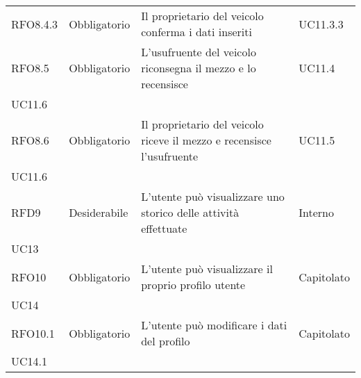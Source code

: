 \begin{longtable}{ >{\centering}p{} >{\centering}p{}
		>{\raggedright}p{} >{\centering}p{}}
	RFO8.4.3 &	Obbligatorio &	Il proprietario del veicolo conferma i dati inseriti &	UC11.3.3 \tabularnewline
	RFO8.5 & Obbligatorio &	L’usufruente del veicolo riconsegna il mezzo e lo recensisce &	UC11.4 \\ UC11.6 \tabularnewline
	RFO8.6 &	Obbligatorio &	Il proprietario del veicolo riceve il mezzo e recensisce l’usufruente	& UC11.5\\ UC11.6 \tabularnewline	
	RFD9	&	Desiderabile	&	L'utente può visualizzare uno storico delle attività effettuate		&	Interno \\ UC13	\tabularnewline
	RFO10	&	Obbligatorio	&	L'utente può visualizzare il proprio profilo utente	&	Capitolato \\ UC14	\tabularnewline
	RFO10.1	&	Obbligatorio	&	L'utente può modificare i dati del profilo	&	Capitolato \\ UC14.1	\tabularnewline


\end{longtable}
